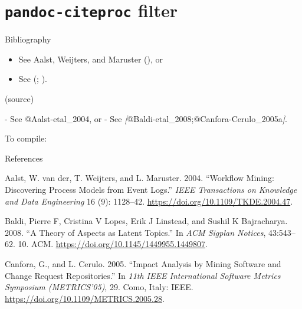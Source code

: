 \documentclass[
  10pt,
  ignorenonframetext,
  serif,onlymath]{beamer}
\newenvironment{Shaded}{}{}
\newcommand{\AttributeTok}[1]{\textcolor[rgb]{0.49,0.56,0.16}{#1}}
\newcommand{\CommentTok}[1]{\textcolor[rgb]{0.38,0.63,0.69}{\textit{#1}}}
\newcommand{\DataTypeTok}[1]{\textcolor[rgb]{0.56,0.13,0.00}{#1}}
\newcommand{\ExtensionTok}[1]{#1}
\newcommand{\NormalTok}[1]{#1}
\newcommand{\OtherTok}[1]{\textcolor[rgb]{0.00,0.44,0.13}{#1}}
\newcommand{\SpecialStringTok}[1]{\textcolor[rgb]{0.73,0.40,0.53}{#1}}
\providecommand{\tightlist}{%
  \setlength{\itemsep}{0pt}\setlength{\parskip}{0pt}}
\newlength{\cslhangindent}
\newenvironment{CSLReferences}[2] %
 {\begin{list}{}{%
  \setlength{\itemindent}{0pt}
  \setlength{\leftmargin}{0pt}
  \setlength{\parsep}{0pt}
  \ifodd #1
   \setlength{\leftmargin}{\cslhangindent}
   \setlength{\itemindent}{-1\cslhangindent}
  \fi
  \setlength{\itemsep}{#2\baselineskip}}}
 {\end{list}}
\begin{document}
\section{\texorpdfstring{\texttt{pandoc-citeproc}
filter}{pandoc-citeproc filter}}\label{pandoc-citeproc-filter}

\begin{frame}[fragile]{Bibliography}
\label{bibliography}
\begin{itemize}
\tightlist
\item
  See Aalst, Weijters, and Maruster
  (), or
\item
  See (;
  ).
\end{itemize}

(source)

\begin{Shaded}
\begin{Highlighting}[]
\SpecialStringTok{{-} }\NormalTok{See @Aalst{-}etal\_2004, or}
\SpecialStringTok{{-} }\NormalTok{See }\CommentTok{[}\OtherTok{@Baldi{-}etal\_2008;@Canfora{-}Cerulo\_2005a}\CommentTok{]}\NormalTok{.}
\end{Highlighting}
\end{Shaded}

To compile:

\begin{Shaded}
\end{Shaded}
\end{frame}

\begin{frame}[allowframebreaks]{References}
\label{references}
\label{refs}
\begin{CSLReferences}{1}{0}
Aalst, W. van der, T. Weijters, and L. Maruster. 2004. {``Workflow
Mining: Discovering Process Models from Event Logs.''} \emph{IEEE
Transactions on Knowledge and Data Engineering} 16 (9): 1128--42.
\url{https://doi.org/10.1109/TKDE.2004.47}.

Baldi, Pierre F, Cristina V Lopes, Erik J Linstead, and Sushil K
Bajracharya. 2008. {``A Theory of Aspects as Latent Topics.''} In
\emph{ACM Sigplan Notices}, 43:543--62. 10. ACM.
\url{https://doi.org/10.1145/1449955.1449807}.

Canfora, G., and L. Cerulo. 2005. {``Impact Analysis by Mining Software
and Change Request Repositories.''} In \emph{11th IEEE International
Software Metrics Symposium (METRICS'05)}, 29. Como, Italy: IEEE.
\url{https://doi.org/10.1109/METRICS.2005.28}.

\end{CSLReferences}
\end{frame}
\end{document}
